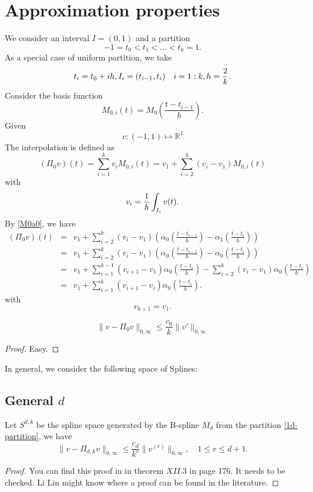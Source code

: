 \section{Approximation properties}
We consider an interval $I =(0,1)$ and a partition
\begin{equation}
  \label{1d-partition}
-1=t_0  < t_1<\ldots<t_k=1.
\end{equation}
As a special case of uniform partition, we take
\begin{equation}
\label{tk}
t_i=t_0+ih, I_i=(t_{i-1}, t_i)\quad i=1:k, h={2\over k}.  
\end{equation}
Consider the basis function 
$$
M_{0,i}(t)=M_0(\frac{t-t_{i-1}}{h}).
$$
Given 
$$
v: (-1,1)\mapsto \mathbb R^1
$$
The interpolation is defined as
\begin{equation}
  \label{interp0}
(\Pi_0v)(t) =\sum_{i=1}^kv_iM_{0,i}(t)
=v_1+\sum_{i=2}^k(v_i-v_1)M_{0,i}(t)
\end{equation}
with 
$$ 
v_i={1\over h}\int_{I_i}v(t).
$$
By \eqref{M0a0}, we have
\begin{eqnarray}
(\Pi_0v)(t)
&=&v_1+\sum_{i=2}^k(v_i-v_1)(\alpha_{0}(\frac{t-t_{i-1}}{h})-\alpha_{1}(\frac{t-t_{i}}{h}))\\
&=&v_1+\sum_{i=2}^k(v_i-v_1)(\alpha_{0}(\frac{t-t_{i-1}}{h})-\alpha_{0}(\frac{t-t_{i}}{h}))\\
&=&v_1+\sum_{i=1}^{k-1}(v_{i+1}-v_1)\alpha_{0}(\frac{t-t_{i}}{h})-
\sum_{i=2}^k(v_i-v_1)\alpha_{0}(\frac{t-t_{i}}{h})\\
&=&v_1+\sum_{i=1}^{k}(v_{i+1}-v_i)\alpha_{0}(\frac{t-t_{i}}{h}).
\end{eqnarray}
with 
$$
v_{k+1}=v_{1}.
$$
\begin{theorem}
  \label{M0-error}
  \begin{equation}
  \label{Pi0-error}
\|v-\Pi_0v\|_{0,\infty}\le \frac{c_0}{k}\|v'\|_{0,\infty}
\end{equation}
\end{theorem}
\begin{proof}
Easy.   
\end{proof}
In general, we consider the following space of Splines:
\begin{theorem}  \label{Md-error}

\subsection{General $d$}
Let $S^{d,k}$ be the spline space generated by the B-spline $M_d$ from
the partition \eqref{1d-partition}, we have
  \begin{equation}
  \label{Pid-error}
\|v-\Pi_{d,k}v\|_{0,\infty}\le \frac{c_d}{k^r}\|v^{(r)}\|_{0,\infty},
\quad 1\le r\le d+1.
\end{equation}
\end{theorem}
\begin{proof}
	You can find this proof in \cite{de1978practical} in theorem $XII.3$ in page 176.
It needs to be checked.  Li Lin might know where a proof can be found
in the literature. 
\end{proof}

